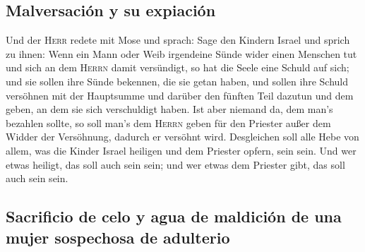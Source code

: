 \hypertarget{malversaciuxf3n-y-su-expiaciuxf3n}{%
\subsection{Malversación y su
expiación}\label{malversaciuxf3n-y-su-expiaciuxf3n}}

 Und der \textsc{Herr} redete mit Mose und sprach:
 Sage den Kindern Israel und sprich zu ihnen: Wenn ein
Mann oder Weib irgendeine Sünde wider einen Menschen tut und sich an dem
\textsc{Herrn} damit versündigt, so hat die Seele eine Schuld auf sich;
 und sie sollen ihre Sünde bekennen, die sie getan haben,
und sollen ihre Schuld versöhnen mit der Hauptsumme und darüber den
fünften Teil dazutun und dem geben, an dem sie sich verschuldigt haben.
 Ist aber niemand da, dem man's bezahlen sollte, so soll
man's dem \textsc{Herrn} geben für den Priester außer dem Widder der
Versöhnung, dadurch er versöhnt wird.  Desgleichen soll
alle Hebe von allem, was die Kinder Israel heiligen und dem Priester
opfern, sein sein.  Und wer etwas heiligt, das soll auch
sein sein; und wer etwas dem Priester gibt, das soll auch sein sein.

\hypertarget{sacrificio-de-celo-y-agua-de-maldiciuxf3n-de-una-mujer-sospechosa-de-adulterio}{%
\subsection{Sacrificio de celo y agua de maldición de una mujer
sospechosa de
adulterio}\label{sacrificio-de-celo-y-agua-de-maldiciuxf3n-de-una-mujer-sospechosa-de-adulterio}}

